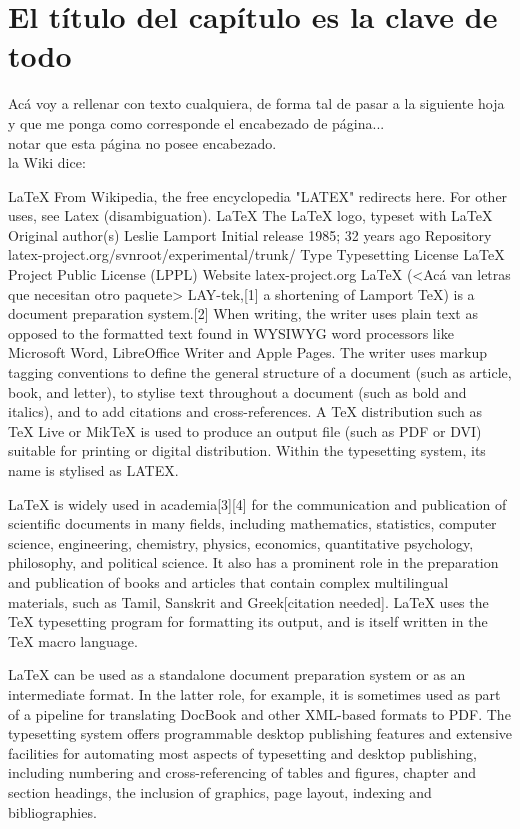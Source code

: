 \chapter{El título del capítulo es la clave de todo}
  Acá voy a rellenar con texto cualquiera, de forma tal de pasar a la siguiente hoja y que me ponga como corresponde el encabezado de página...\\

  notar que esta página no posee encabezado.\\

  la Wiki dice:

  LaTeX
From Wikipedia, the free encyclopedia
"LATEX" redirects here. For other uses, see Latex (disambiguation).
LaTeX
The LaTeX logo, typeset with LaTeX
Original author(s)	Leslie Lamport
Initial release	1985; 32 years ago
Repository	latex-project.org/svnroot/experimental/trunk/
Type	Typesetting
License	LaTeX Project Public License (LPPL)
Website	latex-project.org
LaTeX (<Acá van letras que necesitan otro paquete> LAY-tek,[1] a shortening of Lamport TeX) is a document preparation system.[2] When writing, the writer uses plain text as opposed to the formatted text found in WYSIWYG word processors like Microsoft Word, LibreOffice Writer and Apple Pages. The writer uses markup tagging conventions to define the general structure of a document (such as article, book, and letter), to stylise text throughout a document (such as bold and italics), and to add citations and cross-references. A TeX distribution such as TeX Live or MikTeX is used to produce an output file (such as PDF or DVI) suitable for printing or digital distribution. Within the typesetting system, its name is stylised as LATEX.

LaTeX is widely used in academia[3][4] for the communication and publication of scientific documents in many fields, including mathematics, statistics, computer science, engineering, chemistry, physics, economics, quantitative psychology, philosophy, and political science. It also has a prominent role in the preparation and publication of books and articles that contain complex multilingual materials, such as Tamil, Sanskrit and Greek[citation needed]. LaTeX uses the TeX typesetting program for formatting its output, and is itself written in the TeX macro language.

LaTeX can be used as a standalone document preparation system or as an intermediate format. In the latter role, for example, it is sometimes used as part of a pipeline for translating DocBook and other XML-based formats to PDF. The typesetting system offers programmable desktop publishing features and extensive facilities for automating most aspects of typesetting and desktop publishing, including numbering and cross-referencing of tables and figures, chapter and section headings, the inclusion of graphics, page layout, indexing and bibliographies.

